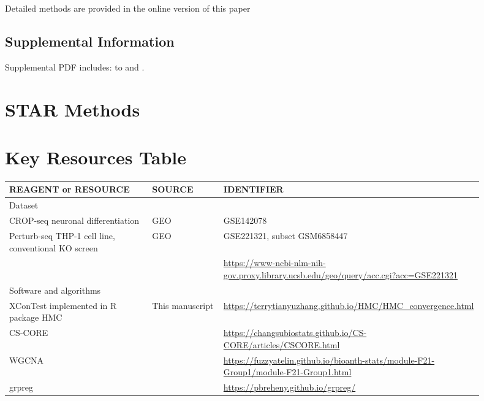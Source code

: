 \documentclass[11pt]{article}
\begin{document}
Detailed methods are provided in the online version of this paper

\subsection*{Supplemental Information}
Supplemental PDF includes:  to  and .


%




\newpage

\section*{STAR Methods}

\section*{Key Resources Table}
\begin{table}[!h]
\centering
\begin{tabular}{>{\raggedright\arraybackslash}p{0.30\linewidth}
                >{\raggedright\arraybackslash}p{0.15\linewidth}
                >{\raggedright\arraybackslash}p{0.45\linewidth}}
\toprule
\textbf{REAGENT or RESOURCE} & \textbf{SOURCE} & \textbf{IDENTIFIER} \\
\midrule
Dataset & & \\
\midrule
CROP-seq neuronal differentiation & GEO \citep{lalli2020high} & GSE142078 \\
Perturb-seq THP-1 cell line, conventional KO screen & GEO \citep{yao2024scalable} & GSE221321, subset GSM6858447\\ 
& & \url{https://www-ncbi-nlm-nih-gov.proxy.library.ucsb.edu/geo/query/acc.cgi?acc=GSE221321} \\
\midrule
Software and algorithms & & \\
\midrule
XConTest implemented in R package HMC  & This manuscript & \url{https://terrytianyuzhang.github.io/HMC/HMC_convergence.html} \\
CS-CORE & \cite{su2023cell} & \url{https://changsubiostats.github.io/CS-CORE/articles/CSCORE.html} \\
WGCNA & \cite{langfelder2008wgcna} &   \url{https://fuzzyatelin.github.io/bioanth-stats/module-F21-Group1/module-F21-Group1.html} \\
grpreg & \cite{breheny2015group}  & \url{https://pbreheny.github.io/grpreg/} \\
\bottomrule
\end{tabular}
\end{table}
\end{document}
